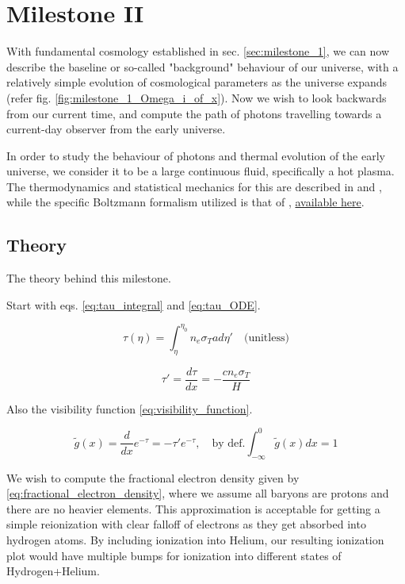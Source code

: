 \section{Milestone II}\label{sec:milestone_2}
With fundamental cosmology established in sec. \ref{sec:milestone_1}, we can now describe the baseline or so-called "background" behaviour of our universe, with a relatively simple evolution of cosmological parameters as the universe expands (refer fig. \ref{fig:milestone_1_Omega_i_of_x}). Now we wish to look backwards from our current time, and compute the path of photons travelling towards a current-day observer from the early universe.

In order to study the behaviour of photons and thermal evolution of the early universe, we consider it to be a large continuous fluid, specifically a hot plasma. The thermodynamics and statistical mechanics for this are described in \citet[][chap.~x]{baumannLectureNotesCosmology2017} and \citet[][chap.~x]{dodelsonModernCosmology2003}, while the specific Boltzmann formalism utilized is that of \citet[][]{wintherCosmologyIILecture2024}, \href{https://cmb.wintherscoming.no/theory_thermodynamics.php#thermo}{available here}.

\subsection{Theory}
The theory behind this milestone.

Start with eqs. \ref{eq:tau_integral} and \ref{eq:tau_ODE}.

\begin{equation}\label{eq:tau_integral}
\tau(\eta) = \int_{\eta}^{\eta_0} n_e \sigma_T a d\eta' \quad \text{(unitless)}
\end{equation}

\begin{equation}\label{eq:tau_ODE}
\boxed{\tau' = \frac{d\tau}{dx} = -\frac{c n_e \sigma_T }{H}}
\end{equation}

Also the visibility function \ref{eq:visibility_function}.

\begin{equation}\label{eq:visibility_function}
\tilde{g}(x) = \frac{d}{dx}e^{-\tau} = -\tau' e^{-\tau}, \quad \text{by def.} \int_{-\infty}^{0} \tilde{g}(x)dx = 1
\end{equation}

We wish to compute the fractional electron density given by \ref{eq:fractional_electron_density}, where we assume all baryons are protons and there are no heavier elements. This approximation is acceptable for getting a simple reionization with clear falloff of electrons as they get absorbed into hydrogen atoms. By including ionization into Helium, our resulting ionization plot would have multiple bumps for ionization into different states of Hydrogen+Helium.


